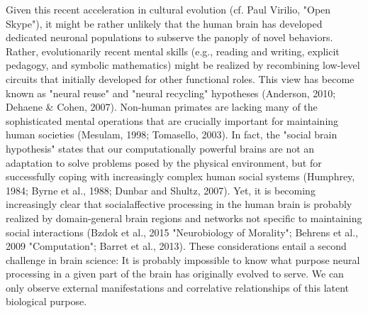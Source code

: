 \documentclass[authoryear,review,3p]{elsarticle}
\begin{document}
Given this recent acceleration in cultural evolution
(cf. Paul Virilio, "Open Skype"),
it might be
rather unlikely that the human brain has developed dedicated
neuronal populations to subserve the panoply of novel behaviors.
Rather, evolutionarily recent mental skills
(e.g., reading and writing, explicit pedagogy, and
symbolic mathematics)
might be realized by recombining low-level circuits that initially
developed for other functional roles.
This view has become known as
"neural reuse" and "neural recycling" hypotheses
(Anderson, 2010; Dehaene \& Cohen, 2007).
Non-human primates are lacking many of the sophisticated
mental operations that
are crucially important for maintaining human societies
(Mesulam, 1998; Tomasello, 2003).
In fact,
the "social brain hypothesis" states that our
computationally powerful brains are not an adaptation to
solve problems posed by the physical environment,
but for successfully coping with increasingly complex human social systems
(Humphrey, 1984; Byrne et al., 1988; Dunbar and Shultz, 2007).
Yet, it is becoming increasingly clear that socialaffective processing
in the human brain is probably realized by domain-general
brain regions and networks not specific to maintaining social interactions
(Bzdok et al., 2015 "Neurobiology of Morality"; Behrens et al., 2009 "Computation";
Barret et al., 2013).
These considerations entail a second challenge in brain science:
It is probably impossible to know what purpose neural
processing in a given part of the brain has originally evolved to serve.
We can only observe external manifestations and correlative relationships of
this latent biological purpose.
\end{document}
